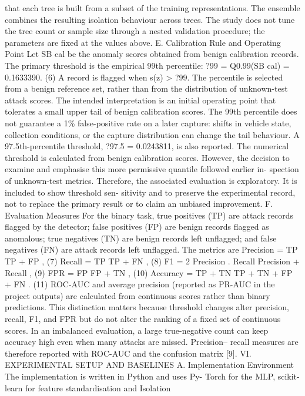 \documentclass[
]{article}
\begin{document}
that each tree is built from a subset of the training representations.
The ensemble combines the resulting isolation behaviour across trees.
The study does not tune the tree count or sample size through a nested
validation procedure; the parameters are fixed at the values above. E.
Calibration Rule and Operating Point Let SB cal be the anomaly scores
obtained from benign calibration records. The primary threshold is the
empirical 99th percentile: ?99 = Q0.99(SB cal) = 0.1633390. (6) A record
is flagged when s(z) \textgreater{} ?99. The percentile is selected from
a benign reference set, rather than from the distribution of
unknown-test attack scores. The intended interpretation is an initial
operating point that tolerates a small upper tail of benign calibration
scores. The 99th percentile does not guarantee a 1\% false-positive rate
on a later capture: shifts in vehicle state, collection conditions, or
the capture distribution can change the tail behaviour. A
97.5th-percentile threshold, ?97.5 = 0.0243811, is also reported. The
numerical threshold is calculated from benign calibration scores.
However, the decision to examine and emphasise this more permissive
quantile followed earlier in- spection of unknown-test metrics.
Therefore, the associated evaluation is exploratory. It is included to
show threshold sen- sitivity and to preserve the experimental record,
not to replace the primary result or to claim an unbiased improvement.
F. Evaluation Measures For the binary task, true positives (TP) are
attack records flagged by the detector; false positives (FP) are benign
records flagged as anomalous; true negatives (TN) are benign records
left unflagged; and false negatives (FN) are attack records left
unflagged. The metrics are Precision = TP TP + FP , (7) Recall = TP TP +
FN , (8) F1 = 2 Precision . Recall Precision + Recall , (9) FPR = FP FP
+ TN , (10) Accuracy = TP + TN TP + TN + FP + FN . (11) ROC-AUC and
average precision (reported as PR-AUC in the project outputs) are
calculated from continuous scores rather than binary predictions. This
distinction matters because threshold changes alter precision, recall,
F1, and FPR but do not alter the ranking of a fixed set of continuous
scores. In an imbalanced evaluation, a large true-negative count can
keep accuracy high even when many attacks are missed. Precision-- recall
measures are therefore reported with ROC-AUC and the confusion matrix
{[}9{]}. VI. EXPERIMENTAL SETUP AND BASELINES A. Implementation
Environment The implementation is written in Python and uses Py- Torch
for the MLP, scikit-learn for feature standardisation and Isolation
\end{document}
